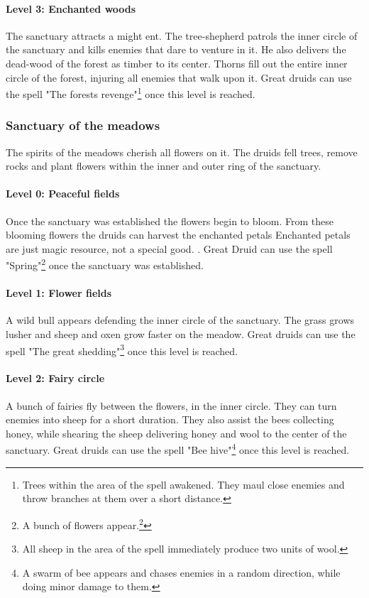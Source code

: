 \documentclass[a4paper]{article}
\begin{document}
			\paragraph{Level 3: Enchanted woods}
				The sanctuary attracts a might ent.
				The tree-shepherd patrols the inner circle of the sanctuary
				and kills enemies that dare to venture in it.
				He also delivers the dead-wood of the forest as timber to its center.
				Thorns fill out the entire inner circle of the forest,
				injuring all enemies that walk upon it.
				Great druids can use the spell "The forests revenge"\footnote{
				Trees within the area of the spell awakened.
				They maul close enemies and throw branches at them over a short distance.
				} once this level is reached.

		\subsubsection{Sanctuary of the meadows}
			The spirits of the meadows cherish all flowers on it.
			The druids fell trees, remove rocks and plant flowers
			within the inner and outer ring of the sanctuary.

			\paragraph{Level 0: Peaceful fields}
				Once the sanctuary was established the flowers begin to bloom.
				From these blooming flowers the druids can harvest the enchanted petals{
					Enchanted petals are just magic resource, not a special good.
				}.
				Great Druid can use the spell "Spring"\footnote{
					A bunch of flowers appear.\footnote{
						Since this is the only way besides the sanctuary to create flowers
						it is a convenient way to either level it up faster or
						get a mead production going.
					}
				} once the sanctuary was established.

			\paragraph{Level 1: Flower fields}
				A wild bull appears defending the inner circle of the sanctuary.
				The grass grows lusher and sheep and oxen grow faster on the meadow.
				Great druids can use the spell "The great shedding"\footnote{
					All sheep in the area of the spell immediately produce two units of wool.
				} once this level is reached.

			\paragraph{Level 2: Fairy circle}
				A bunch of fairies fly between the flowers, in the inner circle.
				They can turn enemies into sheep for a short duration.
				They also assist the bees collecting honey,
				while shearing the sheep delivering honey and wool to the center of the sanctuary.
				Great druids can use the spell "Bee hive"\footnote{
					A swarm of bee appears and chases enemies in a random direction,
					while doing minor damage to them.
				} once this level is reached.
\end{document}
